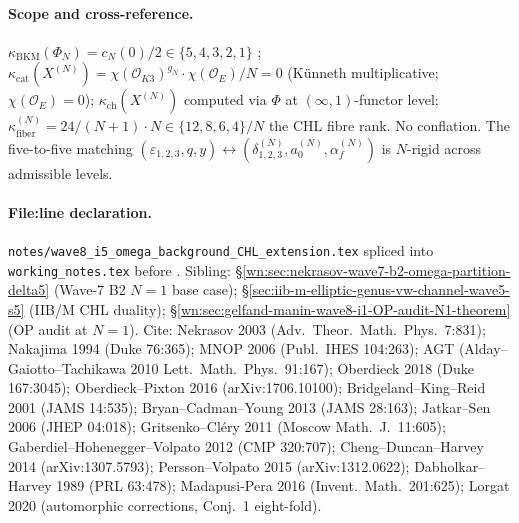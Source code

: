 \paragraph{Scope and cross-reference.}
$\kappa_{\mathrm{BKM}}(\Phi_N)=c_N(0)/2\in\{5,4,3,2,1\}$
\ClaimStatusTheorem; $\kappa_{\mathrm{cat}}(X^{(N)})=
\chi(\mathcal{O}_{K3})^{g_N}\cdot\chi(\mathcal{O}_E)/N=0$
\textup{(}K\"unneth multiplicative; $\chi(\mathcal O_E)=0$\textup{)};
$\kappa_{\mathrm{ch}}(X^{(N)})$ computed via $\Phi$ at
$(\infty,1)$-functor level; $\kappa_{\mathrm{fiber}}^{(N)}=
24/(N+1)\cdot N\in\{12,8,6,4\}/N$ the CHL fibre rank. No
conflation. The five-to-five matching
$(\varepsilon_{1,2,3},q,y)\leftrightarrow
(\delta^{(N)}_{1,2,3},a_0^{(N)},\alpha_f^{(N)})$ is
$N$-rigid across admissible levels.

\paragraph{File:line declaration.}
\texttt{notes/wave8\_i5\_omega\_background\_CHL\_extension.tex}
spliced into \texttt{working\_notes.tex} before
\verb||. Sibling:
\S\ref{wn:sec:nekrasov-wave7-b2-omega-partition-delta5}
\textup{(}Wave-7 B2 $N=1$ base case\textup{)};
\S\ref{sec:iib-m-elliptic-genus-vw-channel-wave5-s5}
\textup{(}IIB/M CHL duality\textup{)};
\S\ref{wn:sec:gelfand-manin-wave8-i1-OP-audit-N1-theorem}
\textup{(}OP audit at $N=1$\textup{)}.
Cite: Nekrasov 2003 \textup{(}Adv.\ Theor.\ Math.\ Phys.\ 7:831\textup{)};
Nakajima 1994 \textup{(}Duke 76:365\textup{)};
MNOP 2006 \textup{(}Publ.\ IHES 104:263\textup{)};
AGT \textup{(}Alday--Gaiotto--Tachikawa 2010 Lett.\ Math.\ Phys.\ 91:167\textup{)};
Oberdieck 2018 \textup{(}Duke 167:3045\textup{)};
Oberdieck--Pixton 2016 \textup{(}arXiv:1706.10100\textup{)};
Bridgeland--King--Reid 2001 \textup{(}JAMS 14:535\textup{)};
Bryan--Cadman--Young 2013 \textup{(}JAMS 28:163\textup{)};
Jatkar--Sen 2006 \textup{(}JHEP 04:018\textup{)};
Gritsenko--Cl\'ery 2011 \textup{(}Moscow Math.\ J.\ 11:605\textup{)};
Gaberdiel--Hohenegger--Volpato 2012 \textup{(}CMP 320:707\textup{)};
Cheng--Duncan--Harvey 2014 \textup{(}arXiv:1307.5793\textup{)};
Persson--Volpato 2015 \textup{(}arXiv:1312.0622\textup{)};
Dabholkar--Harvey 1989 \textup{(}PRL 63:478\textup{)};
Madapusi-Pera 2016 \textup{(}Invent.\ Math.\ 201:625\textup{)};
Lorgat 2020 \textup{(}automorphic corrections, Conj.~1 eight-fold\textup{)}.

